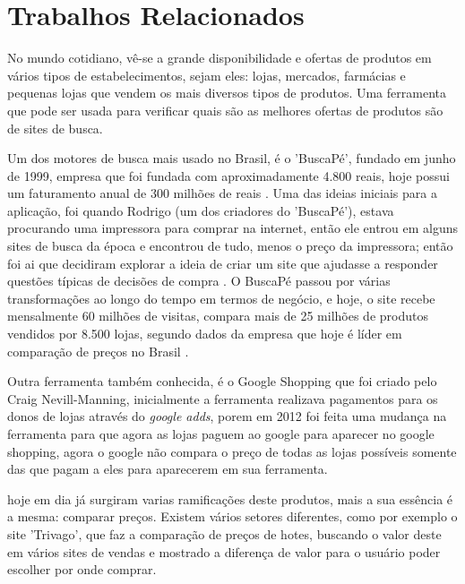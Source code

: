 \section{Trabalhos Relacionados}

No mundo cotidiano, vê-se a grande disponibilidade e ofertas de produtos em vários tipos de estabelecimentos, sejam eles: lojas, mercados, farmácias e pequenas lojas que vendem os mais diversos tipos de produtos. Uma ferramenta que pode ser usada para verificar quais são as melhores ofertas de produtos são de sites de busca.

Um dos motores de busca mais usado no Brasil, é o 'BuscaPé', fundado em junho de 1999, empresa que foi fundada com aproximadamente 4.800 reais, hoje possui um faturamento anual de 300 milhões de reais \cite{EmídiaFelipe2017BUSCAPÉ}. Uma das ideias iniciais para a aplicação, foi quando Rodrigo (um dos criadores do 'BuscaPé'), estava procurando uma impressora para comprar na internet, então ele entrou em alguns sites de busca da época e encontrou de tudo, menos o preço da impressora; então foi ai que decidiram explorar a ideia de criar um site que ajudasse a responder questões típicas de decisões de compra \cite{Arruda2011BuscaPé}. O BuscaPé passou por várias transformações ao longo do tempo em termos de negócio, e hoje, o site recebe mensalmente 60 milhões de visitas, compara mais de 25 milhões de produtos vendidos por 8.500 lojas, segundo dados da empresa que hoje é líder em comparação de preços no Brasil \cite{HELOÍSA2017Startups}.

Outra ferramenta também conhecida, é o Google Shopping que foi criado pelo Craig Nevill-Manning, inicialmente a ferramenta realizava pagamentos para os donos de lojas através do \textit{google adds}, porem em 2012 foi feita uma mudança na ferramenta para que agora as lojas paguem ao google para aparecer no google shopping, agora o google não compara o preço de todas as lojas possíveis somente das que pagam a eles para aparecerem em sua ferramenta.

hoje em dia já surgiram varias ramificações deste produtos, mais a sua essência é a mesma: comparar preços. Existem vários setores diferentes, como por exemplo o site 'Trivago', que faz a comparação de preços de hotes, buscando o valor deste em vários sites de vendas e mostrado a diferença de valor para o usuário poder escolher por onde comprar.